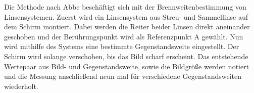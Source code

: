 Die Methode nach Abbe beschäftigt sich mit der Brennweitenbestimmung von Linsensystemen.
Zuerst wird ein Linsensystem aus Streu- und Sammellinse auf
dem Schirm montiert. Dabei werden die Reiter beider Linsen direkt aneinander
geschoben und der Berührungspunkt wird als Referenzpunkt A gewählt. Nun wird
mithilfe des Systems eine bestimmte Gegenstandsweite eingestellt. Der Schirm wird
solange verschoben, bis das Bild scharf erscheint. Das entstehende Wertepaar aus
Bild- und Gegenstandsweite, sowie die Bildgröße werden notiert und die Messung
anschließend neun mal für verschiedene Gegenstandsweiten wiederholt.

\printbibliography


